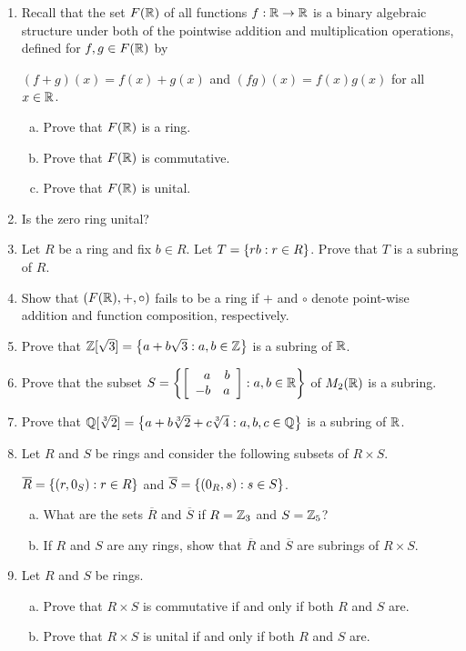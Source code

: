 \documentclass[11pt,fleqn,dvipsnames,usenames]{article}
\begin{document}
\begin{enumerate}[1.]
\item Recall that the set $F(\R)$ of all functions $f:\R\to\R$ is a binary algebraic structure under both of the pointwise addition and multiplication operations, defined for $f,g\in F(\R)$ by
\begin{center}
$(f+g)(x) = f(x) + g(x)$ and $(fg)(x) = f(x)g(x)$ for all $x\in \R$.
\end{center}
\begin{enumerate}[(a)]
\item Prove that $F(\R)$ is a ring.
\item Prove that $F(\R)$ is commutative.
\item Prove that $F(\R)$ is unital.
\end{enumerate}

\item Is the zero ring unital?
\item Let $R$ be a ring and fix $b\in R$.  Let $T = \SET{rb:r\in R}$.  Prove that $T$ is a subring of $R$.
\item Show that $(F(\R),+,\circ)$ fails to be a ring if $+$ and $\circ$ denote point-wise addition and function composition, respectively.
\item Prove that $\Z[\sqrt{3}] = \SET{a + b\sqrt{3}:a,b\in\Z}$ is a subring of $\R$.
\item Prove that the subset $S = \SET{\MATRIX{rr}{a & b\\-b & a}:a,b\in \R}$ of $M_{2}(\R)$ is a subring.
\item Prove that $\Q[\sqrt[3]{2}] = \SET{a + b\sqrt[3]{2} + c\sqrt[3]{4}:a,b,c\in\Q}$ is a subring of $\R$.
\item Let $R$ and $S$ be rings and consider the following subsets of $R\times S$.
\begin{center}
$\overline{R} = \SET{(r,0_{S}):r\in R}$ and $\overline{S} = \SET{(0_{R}, s):s\in S}$.
\end{center}
\begin{enumerate}[(a)]
\item What are the sets $\overline{R}$ and $\overline{S}$ if $R = \Z_{3}$ and $S = \Z_{5}$?
\item If $R$ and $S$ are any rings, show that $\overline{R}$ and $\overline{S}$ are subrings of $R\times S$.
\end{enumerate}
\item Let $R$ and $S$ be rings.
\begin{enumerate}[(a)]
\item Prove that $R\times S$ is commutative if and only if both $R$ and $S$ are.
\item Prove that $R\times S$ is unital if and only if both $R$ and $S$ are.
\end{enumerate}


\end{enumerate}
\end{document}
